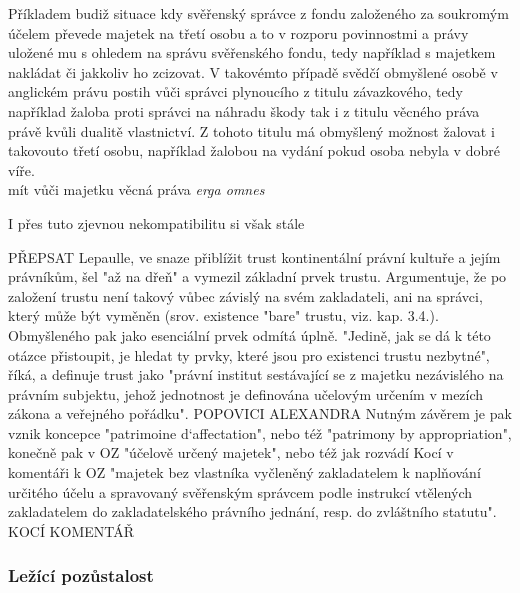 \documentclass{article}
\begin{document}
Příkladem budiž situace kdy svěřenský správce z fondu založeného za soukromým účelem převede majetek na třetí osobu a to v rozporu povinnostmi a právy uložené mu s ohledem na správu svěřenského fondu, tedy například s majetkem nakládat či jakkoliv ho zcizovat. V takovémto případě svědčí obmyšlené osobě v anglickém právu postih vůči správci plynoucího z titulu závazkového, tedy například žaloba proti správci na náhradu škody tak i z titulu věcného práva právě kvůli dualitě vlastnictví. Z tohoto titulu má obmyšlený možnost žalovat i takovouto třetí osobu, například žalobou na vydání pokud osoba nebyla v dobré víře.\\


 mít vůči majetku věcná práva \textit{erga omnes}

I přes tuto zjevnou nekompatibilitu si však stále 


PŘEPSAT
Lepaulle, ve snaze přiblížit trust kontinentální právní kultuře a jejím právníkům, šel "až na dřeň" a vymezil základní prvek trustu. Argumentuje, že po založení trustu není takový vůbec závislý na svém zakladateli, ani na správci, který může být vyměněn (srov. existence "bare" trustu, viz. kap. 3.4.). Obmyšleného pak jako esenciální prvek odmítá úplně. "Jedině, jak se dá k této otázce přistoupit, je hledat ty prvky, které jsou pro existenci trustu nezbytné", říká, a definuje trust jako "právní institut sestávající se z majetku nezávislého na právním subjektu, jehož jednotnost je definována učelovým určením v mezích zákona a veřejného pořádku". POPOVICI ALEXANDRA Nutným závěrem je pak vznik koncepce "patrimoine d`affectation", nebo též "patrimony by appropriation", konečně pak v OZ "účelově určený majetek", nebo též jak rozvádí Kocí v komentáři k OZ "majetek bez vlastníka vyčleněný zakladatelem k naplňování určitého účelu a spravovaný svěřenským správcem podle instrukcí vtělených zakladatelem do zakladatelského právního jednání, resp. do zvláštního statutu". KOCÍ KOMENTÁŘ 


\subsubsection{Ležící pozůstalost}
\end{document}
